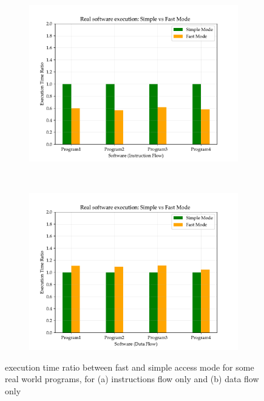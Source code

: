 \documentclass[a4paper,12pt]{article}
\begin{document}
\begin{figure}
  \center
  \begin{subfigure}[b]{.45\textwidth}
    \includegraphics[width=\textwidth]{img/flow-i.pdf}
    \caption{}
  \end{subfigure}
  ~
  \begin{subfigure}[b]{.45\textwidth}
    \includegraphics[width=\textwidth]{img/flow-d.pdf}
    \caption{}
  \end{subfigure}

  \caption{execution time ratio between fast and simple access mode for some real world programs, for (a) instructions flow only and (b) data flow only}
  \label{fig:flow-i-d}
\end{figure}
\end{document}
